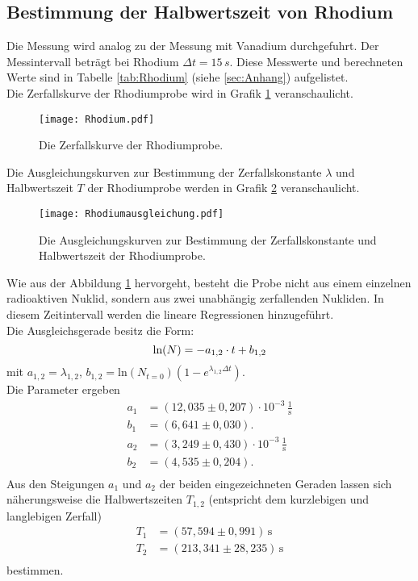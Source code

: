\subsection{Bestimmung der Halbwertszeit von Rhodium}
Die Messung wird analog zu der Messung mit Vanadium durchgefuhrt. Der Messintervall beträgt bei Rhodium $\Delta t= 15\,s$.
Diese Messwerte und berechneten Werte sind in Tabelle \ref{tab:Rhodium} (siehe \ref{sec:Anhang}) aufgelistet. \\
Die Zerfallskurve der Rhodiumprobe wird in Grafik \ref{fig:Rhodium} veranschaulicht.
\begin{figure}[H]
  \centering
  \texttt{[image: Rhodium.pdf]}
  \caption{Die Zerfallskurve der Rhodiumprobe.}
  \label{fig:Rhodium}
\end{figure}
\noindent Die Ausgleichungskurven zur Bestimmung der Zerfallskonstante $\lambda$ und Halbwertszeit $T$ der Rhodiumprobe werden in Grafik \ref{fig:Rhodiumausgleichung} veranschaulicht.
\begin{figure}[H]
  \centering
  \texttt{[image: Rhodiumausgleichung.pdf]}
  \caption{Die Ausgleichungskurven zur Bestimmung der Zerfallskonstante und Halbwertszeit der Rhodiumprobe.}
  \label{fig:Rhodiumausgleichung}
\end{figure}
\noindent Wie aus der Abbildung \ref{fig:Rhodium} hervorgeht, besteht die Probe nicht aus einem einzelnen radioaktiven Nuklid, sondern
aus zwei unabhängig zerfallenden Nukliden.
In diesem Zeitintervall werden die lineare Regressionen hinzugeführt.\\
Die Ausgleichsgerade besitz die Form:
\begin{equation}
 \text{ln}(N)=-a_{1,2}\cdot t+b_{1,2}\\ 
\end{equation}
mit \(a_{1,2}= \lambda_{1,2}\), \(b_{1,2}=\text{ln}(N_{t=0})(1-e^{\lambda_{1,2} \Delta t})\).\\
Die Parameter ergeben 
\begin{align*}
  a_1 &=(12,035 \pm0,207) \cdot 10^{-3}\,\mathrm{\frac{1}{s}} \\
  b_1 &=(6,641\pm0,030 ) .\\
  a_2 &=(3,249 \pm0,430) \cdot 10^{-3}\,\mathrm{\frac{1}{s}} \\
  b_2 &=(4,535\pm0,204 ) .\\
 \end{align*}
\noindent 
\newpage
\noindent Aus den Steigungen $a_1$ und $a_2$ der beiden eingezeichneten Geraden lassen sich näherungsweise die Halbwertszeiten $T_{1,2}$ (entspricht dem kurzlebigen und langlebigen  Zerfall)
\begin{align*}
 T_1 &= (57,594 \pm 0,991)\,\mathrm{s} \\
 T_2 &= (213,341 \pm 28,235)\,\mathrm{s}\\
\end{align*}
bestimmen.

\label{sec:Auswertung}
